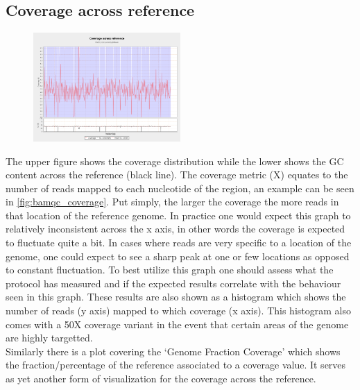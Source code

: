 \subsection{Coverage across reference \label{subsec:bamqc_coverage}}
\begin{figure}
  \begin{center}
    \includegraphics[width=0.5\textwidth]{figures/bamqc_coverage.png}
  \end{center}
  \label{fig:bamqc_coverage}
\end{figure}
The upper figure shows the coverage distribution while the lower shows the GC content across the reference (black line). The coverage metric (X) equates to the number of reads mapped to each nucleotide of the region, an example can be seen in \autoref{fig:bamqc_coverage}. Put simply, the larger the coverage the more reads in that location of the reference genome. In practice one would expect this graph to relatively inconsistent across the x axis, in other words the coverage is expected to fluctuate quite a bit. In cases where reads are very specific to a location of the genome, one could expect to see a sharp peak at one or few locations as opposed to constant fluctuation. To best utilize this graph one should assess what the protocol has measured and if the expected results correlate with the behaviour seen in this graph. These results are also shown as a histogram which shows the number of reads (y axis) mapped to which coverage (x axis). This histogram also comes with a 50X coverage variant in the event that certain areas of the genome are highly targetted.\\
Similarly there is a plot covering the `Genome Fraction Coverage' which shows the fraction/percentage of the reference associated to a coverage value. It serves as yet another form of visualization for the coverage across the reference.


